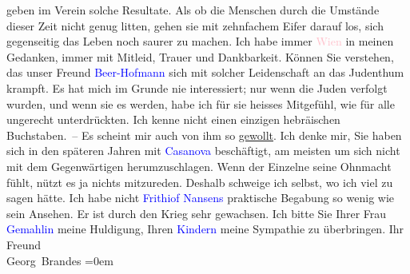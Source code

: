                   \introOben{}geben\introOben{} im Verein 
               solche Resultate. Als ob die Menschen durch die Umstände dieser Zeit nicht genug
               litten, gehen sie mit zehnfachem Eifer darauf los, sich gegenseitig das Leben noch
               saurer zu machen.\pend
           \pstart
           Ich habe immer \textcolor{pink}{Wien}{}\ledrightnote{\textcolor{pink}{Wien}} in meinen Gedanken, immer mit
               Mitleid, Trauer und Dankbarkeit. Können Sie verstehen, das unser Freund \textcolor{blue}{Beer-Hofmann}{}\ledrightnote{\textcolor{blue}{Richard Beer-Hofmann}} sich {\pb}mit solcher Leidenschaft an das
               Judenthum krampft. Es hat mich im Grunde nie interessiert; nur wenn die Juden
               verfolgt wurden, und wenn sie es werden, habe ich für sie heisses Mitgefühl, wie für
               alle ungerecht unterdrückten. Ich kenne nicht einen einzigen hebräischen
               Buchstaben. – Es scheint mir auch von ihm so \uline{gewollt}.\pend
           \pstart
           Ich denke mir, Sie haben sich in den späteren Jahren mit \textcolor{blue}{Casanova}{}\ledrightnote{\textcolor{blue}{Giacomo Girolamo Casanova}} beschäftigt, am meisten um sich nicht mit dem
               Gegenwärtigen herumzuschlagen. Wenn der Einzelne seine Ohnmacht fühlt, nützt es ja
               nichts mitzureden. Deshalb schweige ich selbst, wo ich viel zu sagen hätte. Ich habe
               nicht \textcolor{blue}{Frithiof Nansens}{}\ledrightnote{\textcolor{blue}{Fridtjof Nansen}} praktische Begabung so
               wenig wie sein Ansehen. Er ist durch den Krieg sehr gewachsen.\pend
           \pstart
           Ich bitte Sie Ihrer Frau \textcolor{blue}{Gemahlin}{} meine Huldigung, Ihren \textcolor{blue}{Kindern}{} meine Sympathie zu überbringen.\pend
           \pstart
           Ihr Freund{\\[\baselineskip]}\spacefill\mbox{Georg Brandes}\pend
           \leftskip=0em{}\endnumbering{}  
      